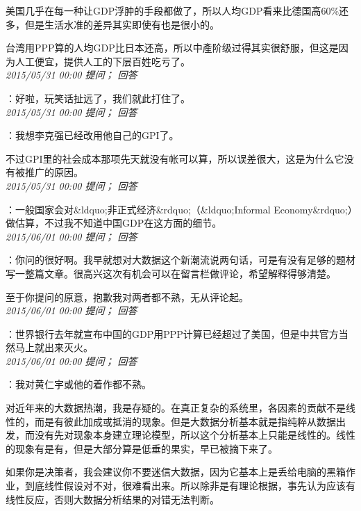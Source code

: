 \documentclass[twocolumn]{ctexart}
\begin{document}
美国几乎在每一种让GDP浮肿的手段都做了，所以人均GDP看来比德国高60\%还多，但是生活水准的差异其实即使有也是很小的。

台湾用PPP算的人均GDP比日本还高，所以中產阶级过得其实很舒服，但这是因为人工便宜，提供人工的下层百姓吃亏了。\\

\textit{\hfill\noindent\small 2015/05/31 00:00 提问； 回答}

：好啦，玩笑话扯远了，我们就此打住了。\\

\textit{\hfill\noindent\small 2015/05/31 00:00 提问； 回答}

：我想李克强已经改用他自己的GPI了。

不过GPI里的社会成本那项先天就没有帐可以算，所以误差很大，这是为什么它没有被推广的原因。\\

\textit{\hfill\noindent\small 2015/05/31 00:00 提问； 回答}

：一般国家会对\&ldquo;非正式经济\&rdquo;（\&ldquo;Informal Economy\&rdquo;）做估算，不过我不知道中国GDP在这方面的细节。\\

\textit{\hfill\noindent\small 2015/06/01 00:00 提问； 回答}

：你问的很好啊。我早就想对大数据这个新潮流说两句话，可是有没有足够的题材写一整篇文章。很高兴这次有机会可以在留言栏做评论，希望解释得够清楚。

至于你提问的原意，抱歉我对两者都不熟，无从评论起。\\

\textit{\hfill\noindent\small 2015/06/01 00:00 提问； 回答}

：世界银行去年就宣布中国的GDP用PPP计算已经超过了美国，但是中共官方当然马上就出来灭火。\\

\textit{\hfill\noindent\small 2015/06/01 00:00 提问； 回答}

：我对黄仁宇或他的着作都不熟。

对近年来的大数据热潮，我是存疑的。在真正复杂的系统里，各因素的贡献不是线性的，而是有彼此加成或抵消的现象。但是大数据分析基本就是指纯粹从数据出发，而没有先对现象本身建立理论模型，所以这个分析基本上只能是线性的。线性的现象有是有，但是大部分算是低垂的果实，早已被摘下来了。

如果你是决策者，我会建议你不要迷信大数据，因为它基本上是丢给电脑的黑箱作业，到底线性假设对不对，很难看出来。所以除非是有理论根据，事先认为应该有线性反应，否则大数据分析结果的对错无法判断。
\end{document}
